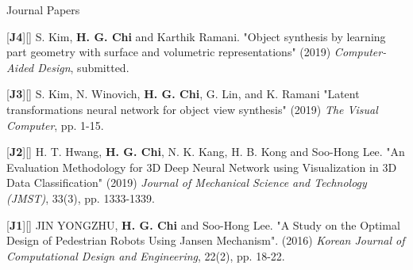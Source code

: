 


\begin{cventries}

\cvpub
{Journal Papers} %
{ %
\begin{cvitems}
\item {[\textbf{J4}][\href{https://docs.google.com/viewer?url=https://github.com/stnoah1/CV/raw/master/documents/CAD.pdf}{}] S. Kim, \textbf{H. G. Chi} and Karthik Ramani. "Object synthesis by learning part geometry with surface and volumetric representations" (2019) \textit{Computer-Aided Design}, submitted.}
\item {[\textbf{J3}][\href{https://link.springer.com/article/10.1007/s00371-019-01755-x}{}] S. Kim, N. Winovich, \textbf{H. G. Chi}, G. Lin, and K. Ramani "Latent transformations neural network for object view synthesis" (2019) \textit{The Visual Computer}, pp. 1-15.}
\item {[\textbf{J2}][\href{https://link.springer.com/content/pdf/10.1007/s12206-019-0233-1.pdf}{}] H. T. Hwang, \textbf{H. G. Chi}, N. K. Kang, H. B. Kong and Soo-Hong Lee. "An Evaluation Methodology for 3D Deep Neural Network using Visualization in 3D Data Classification" (2019) \textit{Journal of Mechanical Science and Technology (JMST)}, 33(3), pp. 1333-1339.}
\item {[\textbf{J1}][\href{https://docs.google.com/viewer?url=https://github.com/stnoah1/CV/raw/master/documents/Edison.pdf}{}] JIN YONGZHU, \textbf{H. G. Chi} and Soo-Hong Lee. "A Study on the Optimal Design of Pedestrian Robots Using Jansen Mechanism". (2016) \textit{Korean Journal of Computational Design and Engineering}, 22(2), pp. 18-22.}
\end{cvitems}
}



\end{cventries}

